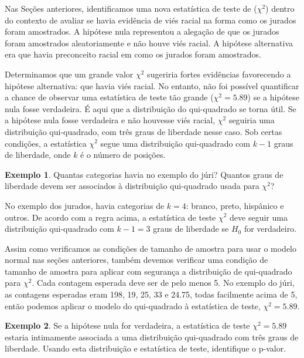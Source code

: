 \documentclass[
]{book}
\theoremstyle{definition}
\theoremstyle{definition}
\newtheorem{example}{Exemplo}[chapter]
\theoremstyle{definition}
\theoremstyle{definition}
\theoremstyle{remark}
\begin{document}
Nas Seções anteriores, identificamos uma nova estatística de teste de (\(\chi^2\)) dentro do contexto de avaliar se havia evidência de viés racial na forma como os jurados foram amostrados. A hipótese nula representou a alegação de que os jurados foram amostrados aleatoriamente e não houve viés racial. A hipótese alternativa era que havia preconceito racial em como os jurados foram amostrados.

Determinamos que um grande valor \(\chi^2\) sugeriria fortes evidências favorecendo a hipótese alternativa: que havia viés racial. No entanto, não foi possível quantificar a chance de observar uma estatística de teste tão grande (\(\chi^2 = 5.89\)) se a hipótese nula fosse verdadeira. É aqui que a distribuição do qui-quadrado se torna útil. Se a hipótese nula fosse verdadeira e não houvesse viés racial, \(\chi^2\) seguiria uma distribuição qui-quadrado, com três graus de liberdade nesse caso. Sob certas condições, a estatística \(\chi^2\) segue uma distribuição qui-quadrado com \(k - 1\) graus de liberdade, onde \(k\) é o número de posições.

\begin{example}
\protect\hypertarget{exm:unnamed-chunk-244}{}{\label{exm:unnamed-chunk-244} }Quantas categorias havia no exemplo do júri? Quantos graus de liberdade devem ser associados à distribuição qui-quadrado usada para \(\chi^2\)?
\end{example}

No exemplo dos jurados, havia categorias de \(k = 4\): branco, preto, hispânico e outros. De acordo com a regra acima, a estatística de teste \(\chi^2\) deve seguir uma distribuição qui-quadrado com \(k-1 = 3\) graus de liberdade se \(H_0\) for verdadeiro.

Assim como verificamos as condições de tamanho de amostra para usar o modelo normal nas seções anteriores, também devemos verificar uma condição de tamanho de amostra para aplicar com segurança a distribuição de qui-quadrado para \(\chi^2\). Cada contagem esperada deve ser de pelo menos 5. No exemplo do júri, as contagens esperadas eram 198, 19, 25, 33 e 24.75, todas facilmente acima de 5, então podemos aplicar o modelo do qui-quadrado à estatística de teste, \(\chi^2 = 5.89\).

\begin{example}
\protect\hypertarget{exm:unnamed-chunk-245}{}{\label{exm:unnamed-chunk-245} }Se a hipótese nula for verdadeira, a estatística de teste \(\chi^2 = 5.89\) estaria intimamente associada a uma distribuição qui-quadrado com três graus de liberdade. Usando esta distribuição e estatística de teste, identifique o p-valor.
\end{example}
\end{document}
